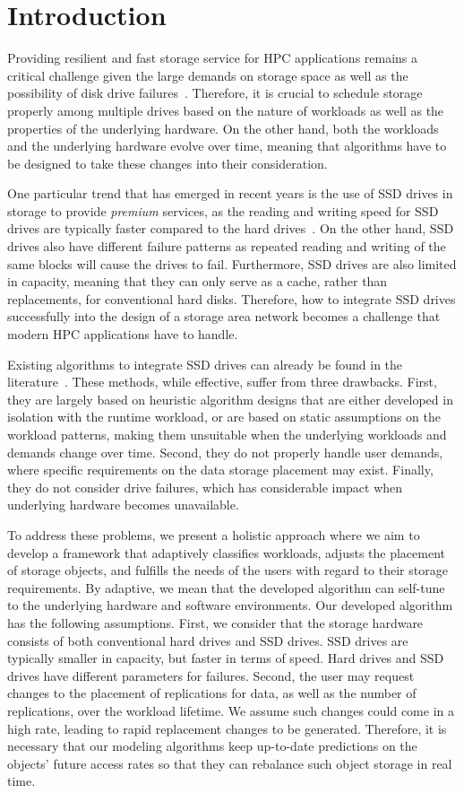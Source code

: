 \section{Introduction}
\label{intro}

Providing resilient and fast storage service for HPC applications remains a critical challenge given the large demands on storage space as well as the possibility of disk drive failures~\cite{}. Therefore, it is crucial to schedule storage properly among multiple drives based on the nature of workloads as well as the properties of the underlying hardware. On the other hand, both the workloads and the underlying hardware evolve over time, meaning that algorithms have to be designed to take these changes into their consideration.

One particular trend that has emerged in recent years is the use of SSD drives in storage to provide \emph{premium} services, as the reading and writing speed for SSD drives are typically faster compared to the hard drives~\cite{}. On the other hand, SSD drives also have different failure patterns as repeated reading and writing of the same blocks will cause the drives to fail. Furthermore, SSD drives are also limited in capacity, meaning that they can only serve as a cache, rather than replacements, for conventional hard disks. Therefore, how to integrate SSD drives successfully into the design of a storage area network becomes a challenge that modern HPC applications have to handle.

Existing algorithms to integrate SSD drives can already be found in the literature~\cite{}. These methods, while effective, suffer from three drawbacks. First, they are largely based on heuristic algorithm designs that are either developed in isolation with the runtime workload, or are based on static assumptions on the workload patterns, making them unsuitable when the underlying workloads and demands change over time. Second, they do not properly handle user demands, where specific requirements on the data storage placement may exist. Finally, they do not consider drive failures, which has considerable impact when underlying hardware becomes unavailable.

To address these problems, we present a holistic approach where we aim to develop a framework that adaptively classifies workloads, adjusts the placement of storage objects, and fulfills the needs of the users with regard to their storage requirements. By adaptive, we mean that the developed algorithm can self-tune to the underlying hardware and software environments. Our developed algorithm has the following assumptions. First, we consider that the storage hardware consists of both conventional hard drives and SSD drives. SSD drives are typically smaller in capacity, but faster in terms of speed. Hard drives and SSD drives have different parameters for failures. Second, the user may request changes to the placement of replications for data, as well as the number of replications, over the workload lifetime. We assume such changes could come in a high rate, leading to rapid replacement changes to be generated. Therefore, it is necessary that our modeling algorithms keep up-to-date predictions on the objects' future access rates so that they can rebalance such object storage in real time.

